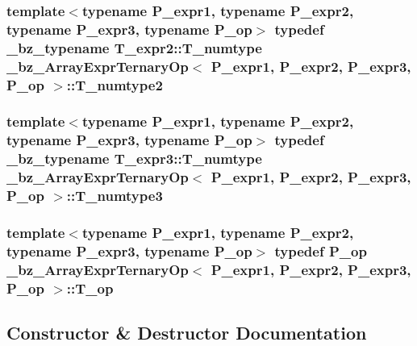 \subsubsection[{T\+\_\+numtype2}]{\setlength{\rightskip}{0pt plus 5cm}template$<$typename P\+\_\+expr1, typename P\+\_\+expr2, typename P\+\_\+expr3, typename P\+\_\+op$>$ typedef {\bf \+\_\+bz\+\_\+typename} T\+\_\+expr2\+::\+T\+\_\+numtype {\bf \+\_\+bz\+\_\+\+Array\+Expr\+Ternary\+Op}$<$ P\+\_\+expr1, P\+\_\+expr2, P\+\_\+expr3, P\+\_\+op $>$\+::{\bf T\+\_\+numtype2}}\label{class__bz__ArrayExprTernaryOp_abafc4185679a1752fa00ff28a3067612}
\hypertarget{class__bz__ArrayExprTernaryOp_ade1a9d3b50d54a64c0ffaaffd2dd08ee}{}
\subsubsection[{T\+\_\+numtype3}]{\setlength{\rightskip}{0pt plus 5cm}template$<$typename P\+\_\+expr1, typename P\+\_\+expr2, typename P\+\_\+expr3, typename P\+\_\+op$>$ typedef {\bf \+\_\+bz\+\_\+typename} T\+\_\+expr3\+::\+T\+\_\+numtype {\bf \+\_\+bz\+\_\+\+Array\+Expr\+Ternary\+Op}$<$ P\+\_\+expr1, P\+\_\+expr2, P\+\_\+expr3, P\+\_\+op $>$\+::{\bf T\+\_\+numtype3}}\label{class__bz__ArrayExprTernaryOp_ade1a9d3b50d54a64c0ffaaffd2dd08ee}
\hypertarget{class__bz__ArrayExprTernaryOp_a41b68c1cd14a31c2ce465fe3d75ebccc}{}
\subsubsection[{T\+\_\+op}]{\setlength{\rightskip}{0pt plus 5cm}template$<$typename P\+\_\+expr1, typename P\+\_\+expr2, typename P\+\_\+expr3, typename P\+\_\+op$>$ typedef P\+\_\+op {\bf \+\_\+bz\+\_\+\+Array\+Expr\+Ternary\+Op}$<$ P\+\_\+expr1, P\+\_\+expr2, P\+\_\+expr3, P\+\_\+op $>$\+::{\bf T\+\_\+op}}\label{class__bz__ArrayExprTernaryOp_a41b68c1cd14a31c2ce465fe3d75ebccc}


\subsection{Constructor \& Destructor Documentation}
\hypertarget{class__bz__ArrayExprTernaryOp_abfaf20ad8f6a962c59fd8b8e8d85096a}{}
